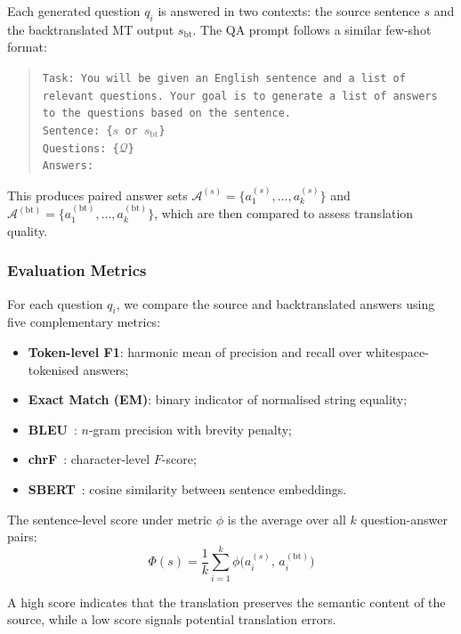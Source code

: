 Each generated question $q_i$ is answered in two contexts: the source sentence $s$ and the backtranslated MT output $s_{\text{bt}}$. The QA prompt follows a similar few-shot format:

\begin{quote}
\small
\texttt{Task: You will be given an English sentence and a list of relevant questions. Your goal is to generate a list of answers to the questions based on the sentence.}\\[3pt]
\texttt{Sentence: \{$s$ or $s_{\text{bt}}$\}}\\
\texttt{Questions: \{$\mathcal{Q}$\}}\\
\texttt{Answers:}
\end{quote}

This produces paired answer sets $\mathcal{A}^{(s)} = \{a_1^{(s)}, \ldots, a_k^{(s)}\}$ and $\mathcal{A}^{(\text{bt})} = \{a_1^{(\text{bt})}, \ldots, a_k^{(\text{bt})}\}$, which are then compared to assess translation quality.

\subsubsection{Evaluation Metrics}

For each question $q_i$, we compare the source and backtranslated answers using five complementary metrics:
\begin{itemize}
    \item \textbf{Token-level F1}: harmonic mean of precision and recall over whitespace-tokenised answers;
    \item \textbf{Exact Match (EM)}: binary indicator of normalised string equality;
    \item \textbf{BLEU}~\cite{papineni2002bleu}: $n$-gram precision with brevity penalty;
    \item \textbf{chrF}~\cite{popovic2015chrf}: character-level $F$-score;
    \item \textbf{SBERT}~\cite{reimers2019sentence}: cosine similarity between sentence embeddings.
\end{itemize}

The sentence-level score under metric $\phi$ is the average over all $k$ question-answer pairs:
\begin{equation}
    \Phi(s) = \frac{1}{k} \sum_{i=1}^{k} \phi\big(a_i^{(s)},\, a_i^{(\text{bt})}\big)
    \label{eq:baseline_agg}
\end{equation}

A high score indicates that the translation preserves the semantic content of the source, while a low score signals potential translation errors.
